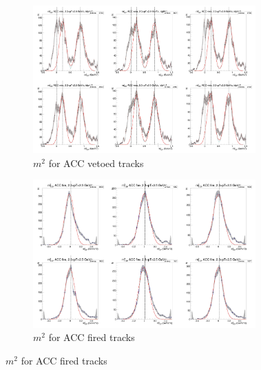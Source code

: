 \begin{figure}[H]
  \ContinuedFloat
    \begin{subfigure}{1\textwidth}
   \centering
   \includegraphics[width=0.94\textwidth]{hiptfits/pos/PSm2_cent0_ich1_accfire0_ptbin9.jpg}
    \caption{$m^2$ for ACC vetoed tracks}
    \end{subfigure}
    \begin{subfigure}{1\textwidth}
   \centering
   \includegraphics[width=0.94\textwidth]{hiptfits/pos/PSm2_cent0_ich1_accfire1_ptbin9.jpg}
    \caption{$m^2$ for ACC fired tracks}
    \end{subfigure}  
\end{figure}
